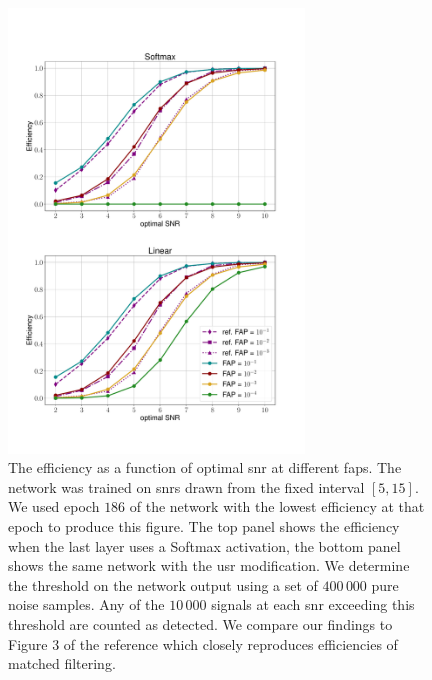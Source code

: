 \begin{figure}
    \centering
    \includegraphics[width=0.7\textwidth]{chapters/training_strats/images/fixed_low_743_186.pdf}
    \caption[Network efficiency at different signal-to-noise ratios]{The efficiency as a function of optimal \acrshort{snr} at different \acrshort{fap}s. The network was trained on \acrshort{snr}s drawn from the fixed interval $\left[5,15\right]$. We used epoch $186$ of the network with the lowest efficiency at that epoch to produce this figure. The top panel shows the efficiency when the last layer uses a Softmax activation, the bottom panel shows the same network with the \acrshort{usr} modification. We determine the threshold on the network output using a set of $400\,000$ pure noise samples. Any of the $10\,000$ signals at each \acrshort{snr} exceeding this threshold are counted as detected. We compare our findings to Figure 3 of the reference \cite{Gabbard:2017lja} which closely reproduces efficiencies of matched filtering.}
    \label{fig:efficiency_example}
\end{figure}

